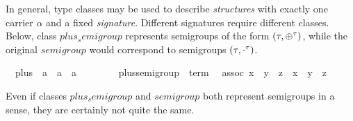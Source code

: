 \begin{isabellebody}
\begin{isamarkuptext}
 \medskip In general, type classes may be used to describe
 \emph{structures} with exactly one carrier $\alpha$ and a fixed
 \emph{signature}.  Different signatures require different classes.
 Below, class $plus_semigroup$ represents semigroups of the form
 $(\tau, \oplus^\tau)$, while the original $semigroup$ would correspond
 to semigroups $(\tau, \cdot^\tau)$.%
\end{isamarkuptext}%
\isanewline
\ \ plus\ {\isacharcolon}{\isacharcolon}\ {\isachardoublequote}{\isacharprime}a\ {\isasymRightarrow}\ {\isacharprime}a\ {\isasymRightarrow}\ {\isacharprime}a{\isachardoublequote}\ \ \ \ {\isacharparenleft}\ {\isachardoublequote}{\isasymOplus}{\isachardoublequote}\ \isanewline
{}\isanewline
\ \ plus{\isacharunderscore}semigroup\ {\isacharless}\ {\isachardoublequote}term{\isachardoublequote}\isanewline
\ \ assoc{\isacharcolon}\ {\isachardoublequote}{\isacharparenleft}x\ {\isasymOplus}\ y{\isacharparenright}\ {\isasymOplus}\ z\ {\isacharequal}\ x\ {\isasymOplus}\ {\isacharparenleft}y\ {\isasymOplus}\ z{\isacharparenright}{\isachardoublequote}%
\begin{isamarkuptext}%
\noindent Even if classes $plus_semigroup$ and $semigroup$ both
 represent semigroups in a sense, they are certainly not quite the
 same.%
\end{isamarkuptext}%
\end{isabellebody}%
